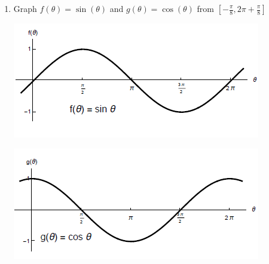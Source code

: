 \documentclass[nooutcomes,handout]{ximera}
\begin{document}
\begin{problem} \hfil

\begin{enumerate}
	\item Graph $f(\theta)=\sin(\theta)$ and $g(\theta)=\cos(\theta)$ from $[-\frac{\pi}{8},2\pi+\frac{\pi}{8}]$
		\begin{freeResponse} \hfil
		\begin{image}
		\includegraphics{figure8.png}
		\end{image}
		\begin{image}
		\includegraphics{figure9.png}
		\end{image}
		\end{freeResponse}


\end{enumerate}
\end{problem}
\end{document}
